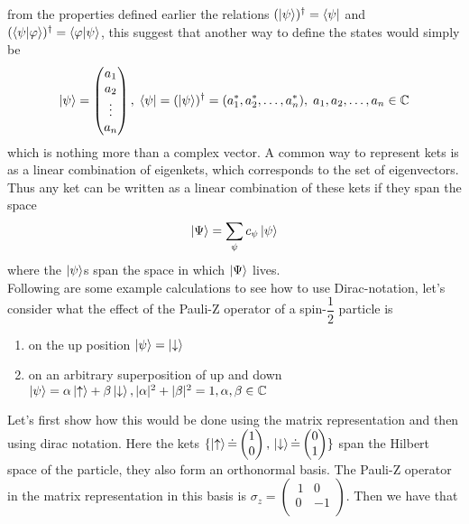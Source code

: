from the properties defined earlier the relations $(\ket{\psi})^\dagger = \bra{\psi}$ and $ (\bra{\psi}\ket{\varphi})^\dagger = \bra{\varphi}\ket{\psi}$,
this suggest that another way to define the states would simply be
\begin{equation}
\ket{\psi} = \begin{pmatrix}
a_1 \\ a_2 \\ \vdots \\ a_n
\end{pmatrix},\;
\bra{\psi} = (\ket{\psi})^{\dagger} = (a_1^{*}, a_2^{*}, \dots, a_n^{*}),\; a_1,a_2,\dots,a_n \in \mathbb{C}
\end{equation}
which is nothing more than a complex vector. A common way to represent kets is as a linear combination of eigenkets, which corresponds to the set of eigenvectors. Thus any ket can be written as a linear combination of these kets if they span the space
\begin{equation}
\ket{\Psi} = \sum_{\psi} c_{\psi}\ket{\psi}
\end{equation}
where the $\ket{\psi}$s span the space in which $\ket{\Psi}$ lives.
\\
Following are some example calculations to see how to use Dirac-notation, let's consider what the effect of the Pauli-Z operator of a spin-$\dfrac{1}{2}$ particle is
\begin{enumerate}[label=\textbf{\alph*)}]
\item on the up position $\ket{\psi} = \ket{\downarrow}$

\item on an arbitrary superposition of up and down $\ket{\psi} = \alpha \ket{\uparrow} + \beta\ket{\downarrow}, |\alpha|^2 + |\beta|^2 = 1, \alpha,\beta \in \mathbb{C}$
\end{enumerate}
Let's first show how this would be done using the matrix representation and then using dirac notation.
Here the kets $\{\ket{\uparrow} \dot{=} \begin{pmatrix}
1 \\ 0
\end{pmatrix}, \, \ket{\downarrow} \dot{=} \begin{pmatrix}
0 \\ 1
\end{pmatrix} \}$ span the Hilbert space of the particle, they also form an orthonormal basis. The Pauli-Z operator in the matrix representation in this basis is $\sigma_z = \begin{pmatrix}
\,1 & 0 \\
0 & -1 \\
\end{pmatrix}$. Then we have that 

